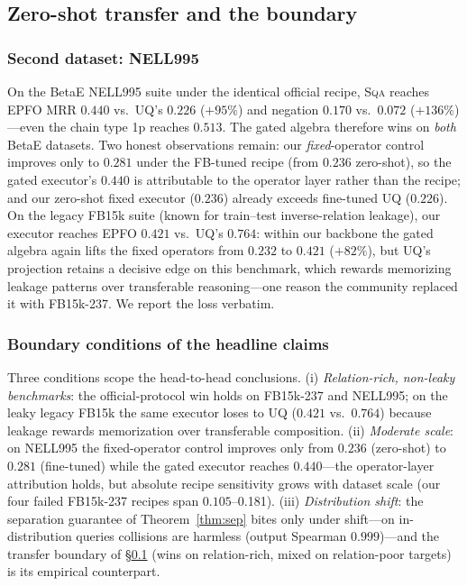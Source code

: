 \documentclass[journal]{IEEEtran}
\newcommand{\SQA}{\textsc{Sqa}}
\begin{document}
\subsection{Zero-shot transfer and the boundary}\label{sec:exp-loo}

\subsubsection{Second dataset: NELL995} On the BetaE NELL995 suite under
the identical official recipe, \SQA{} reaches EPFO MRR $0.440$ vs.\ UQ's
$0.226$ ($+95\%$) and negation $0.170$ vs.\ $0.072$ ($+136\%$)---even the
chain type 1p reaches $0.513$. The gated algebra therefore wins on
\emph{both} BetaE datasets. Two honest observations remain: our
\emph{fixed}-operator control improves only to $0.281$ under the
FB-tuned recipe (from $0.236$ zero-shot), so the gated executor's
$0.440$ is attributable to the operator layer rather than the recipe;
and our zero-shot fixed executor ($0.236$) already exceeds fine-tuned
UQ ($0.226$). On the legacy FB15k suite (known
for train--test inverse-relation leakage), our executor reaches EPFO
$0.421$ vs.\ UQ's $0.764$: within our backbone the gated algebra again
lifts the fixed operators from $0.232$ to $0.421$ ($+82\%$), but UQ's
projection retains a decisive edge on this benchmark, which rewards
memorizing leakage patterns over transferable reasoning---one reason the
community replaced it with FB15k-237. We report the loss verbatim.

\subsubsection{Boundary conditions of the headline claims} Three
conditions scope the head-to-head conclusions. (i) \emph{Relation-rich,
non-leaky benchmarks}: the official-protocol win holds on FB15k-237 and
NELL995; on the leaky legacy FB15k the same executor loses to UQ
($0.421$ vs.\ $0.764$) because leakage rewards memorization over
transferable composition. (ii) \emph{Moderate scale}: on NELL995 the
fixed-operator control improves only from $0.236$ (zero-shot) to
$0.281$ (fine-tuned) while the gated executor reaches $0.440$---the
operator-layer attribution holds, but absolute recipe sensitivity grows
with dataset scale (our four failed FB15k-237 recipes span
$0.105$--0.181). (iii) \emph{Distribution shift}: the separation
guarantee of Theorem~\ref{thm:sep} bites only under shift---on
in-distribution queries collisions are harmless (output Spearman
$0.999$)---and the transfer boundary of \S\ref{sec:exp-loo} (wins on
relation-rich, mixed on relation-poor targets) is its empirical
counterpart.
\end{document}
